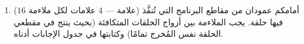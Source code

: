 \documentclass[14pt]{extarticle}
\begin{document}
\begin{enumerate}[label=\textbf{السؤال \arabic*:}, wide=0pt, itemsep=2.2em]
\ifwithsols
\begin{boxSolution}
\begin{enumerate}[label=\arabic*.]
\item \textenglish{\texttt{for item in range(2, 10, 2):}} (أو \textenglish{\texttt{range(2, 9, 2)}})
\item التهيئة $i = 10$، وشرط الحلقة \textenglish{\texttt{while i > 1:}} (أو أي عدد من $1$ إلى $3$)
\item مقدار القفزة $5$: \textenglish{\texttt{for i in range(5, 26, 5):}}
\end{enumerate}
\end{boxSolution}
\fi
\filbreak

\item ($16$ علامة — $4$ علامات لكل ملاءمة) أمامكم عمودان من مقاطع البرنامج التي تُنفَّذ فيها حلقة. يجب الملاءمة بين أزواج الحلقات المتكافئة (بحيث ينتج في مقطعي الحلقة نفس المُخرج تمامًا) وكتابتها في جدول الإجابات أدناه.


\end{enumerate}
\end{document}
